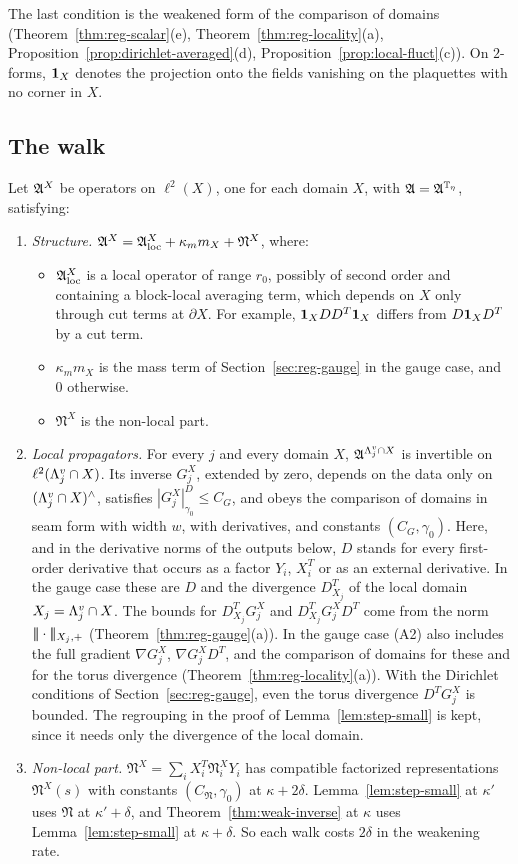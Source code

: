 The last condition is the weakened form of the comparison of domains (Theorem~\ref{thm:reg-scalar}(e), Theorem~\ref{thm:reg-locality}(a), Proposition~\ref{prop:dirichlet-averaged}(d), Proposition~\ref{prop:local-fluct}(c)). On $2$-forms, $\mathbf 1_X$ denotes the projection onto the fields vanishing on the plaquettes with no corner in $X$.

\subsection{The walk}

Let $\mathfrak A^X$ be operators on $\ell^2(X)$, one for each domain $X$, with $\mathfrak A=\mathfrak A^{\mathbb T_\eta}$, satisfying:
\begin{enumerate}[label=(A\arabic*)]
\item \emph{Structure.} $\mathfrak A^X=\mathfrak A^X_{\rm loc}+\kappa_mm_X+\mathfrak N^X$, where:
  \begin{itemize}
  \item $\mathfrak A^X_{\rm loc}$ is a local operator of range $r_0$, possibly of second order and containing a block-local averaging term, which depends on $X$ only through cut terms at $\partial X$. For example, $\mathbf 1_XDD^T\mathbf 1_X$ differs from $D\mathbf 1_XD^T$ by a cut term.
  \item $\kappa_mm_X$ is the mass term of Section~\ref{sec:reg-gauge} in the gauge case, and $0$ otherwise.
  \item $\mathfrak N^X$ is the non-local part.
  \end{itemize}
\item \emph{Local propagators.} For every $j$ and every domain $X$, $\mathfrak A^{\Lambda^v_j\cap X}$ is invertible on $\ell^2(\Lambda^v_j\cap X)$. Its inverse $G^X_j$, extended by zero, depends on the data only on $(\Lambda^v_j\cap X)^\wedge$, satisfies $|G^X_j|^D_{\gamma_0}\le C_G$, and obeys the comparison of domains in seam form with width $w$, with derivatives, and constants $(C_G,\gamma_0)$. Here, and in the derivative norms of the outputs below, $D$ stands for every first-order derivative that occurs as a factor $Y_i$, $X_i^T$ or as an external derivative. In the gauge case these are $D$ and the divergence $D^T_{X_j}$ of the local domain $X_j=\Lambda^v_j\cap X$. The bounds for $D^T_{X_j}G^X_j$ and $D^T_{X_j}G^X_jD^T$ come from the norm $|\!|\!|\cdot|\!|\!|_{X_j,+}$ (Theorem~\ref{thm:reg-gauge}(a)). In the gauge case (A2) also includes the full gradient $\nabla G^X_j$, $\nabla G^X_jD^T$, and the comparison of domains for these and for the torus divergence (Theorem~\ref{thm:reg-locality}(a)). With the Dirichlet conditions of Section~\ref{sec:reg-gauge}, even the torus divergence $D^TG^X_j$ is bounded. The regrouping in the proof of Lemma~\ref{lem:step-small} is kept, since it needs only the divergence of the local domain.
\item \emph{Non-local part.} $\mathfrak N^X=\sum_iX_i^T\mathfrak N^X_iY_i$ has compatible factorized representations $\mathfrak N^X(s)$ with constants $(C_{\mathfrak N},\gamma_0)$ at $\kappa+2\delta$. Lemma~\ref{lem:step-small} at $\kappa'$ uses $\mathfrak N$ at $\kappa'+\delta$, and Theorem~\ref{thm:weak-inverse} at $\kappa$ uses Lemma~\ref{lem:step-small} at $\kappa+\delta$. So each walk costs $2\delta$ in the weakening rate.
\end{enumerate}

